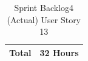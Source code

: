 \documentclass[12pt]{report}
\begin{document}
\begin{table}[h]
{\begin{tabular}{|cc|cccccccccc|}
\multicolumn{2}{|c|}{\textbf{Total}}                                                                                                                                                   & \multicolumn{10}{c|}{32   Hours}                                                                                                                                                                                                                                                                                                                                                                                                                                                                                                                                                                                                                                                                                                                                                                                                                                                                                                                                                                                                                                                                                                                               \\ \hline
\end{tabular}
}
\caption{Sprint Backlog4 (Actual) User Story 13}
\label{tab:mytable}
\end{table}
\end{document}
